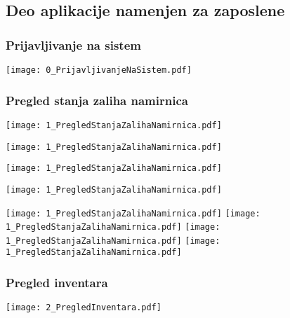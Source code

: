 \documentclass{article}
\begin{document}
\subsection{Deo aplikacije namenjen za zaposlene}
\subsubsection{Prijavljivanje na sistem}
\noindent
\texttt{[image: 0\_PrijavljivanjeNaSistem.pdf]}
\vfill


\subsubsection{Pregled stanja zaliha namirnica}

\texttt{[image: 1\_PregledStanjaZalihaNamirnica.pdf]}

\texttt{[image: 1\_PregledStanjaZalihaNamirnica.pdf]}

\texttt{[image: 1\_PregledStanjaZalihaNamirnica.pdf]}

\texttt{[image: 1\_PregledStanjaZalihaNamirnica.pdf]}

\texttt{[image: 1\_PregledStanjaZalihaNamirnica.pdf]}
\vfill
\noindent
\texttt{[image: 1\_PregledStanjaZalihaNamirnica.pdf]}
\vfill
\noindent
\texttt{[image: 1\_PregledStanjaZalihaNamirnica.pdf]}
\vfill
\noindent
\texttt{[image: 1\_PregledStanjaZalihaNamirnica.pdf]}
\vfill
\subsubsection{Pregled inventara}
%

\texttt{[image: 2\_PregledInventara.pdf]}
\end{document}
